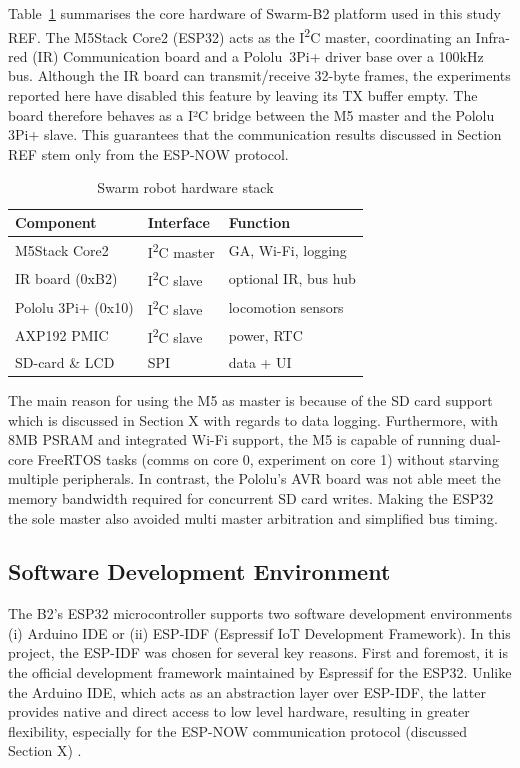 \documentclass[conference]{IEEEtran}
\begin{document}
Table~\ref{tab:B2-hardware} summarises the core hardware of Swarm-B2 platform used in this study REF. The M5Stack Core2 (ESP32) acts as the I\textsuperscript{2}C master, coordinating an Infra-red (IR) Communication board and a Pololu~3Pi+ driver base over a 100kHz bus. Although the IR board can transmit/receive 32-byte frames, the experiments reported here have disabled this feature by leaving its TX buffer empty. The board therefore behaves as a I²C bridge between the M5 master and the Pololu 3Pi+ slave. This guarantees that the communication results discussed in Section REF stem only from the ESP-NOW protocol.\\

\begin{table}[h]
  \centering
  \caption{Swarm robot hardware stack}
  \label{tab:B2-hardware}
  \begin{tabular}{lll}
    \toprule
    Component & Interface & Function \\
    \midrule
    M5Stack Core2 & I\textsuperscript{2}C master & GA, Wi-Fi, logging \\
    IR board (0xB2) & I\textsuperscript{2}C slave & optional IR, bus hub \\
    Pololu 3Pi+ (0x10) & I\textsuperscript{2}C slave & locomotion sensors \\
    AXP192 PMIC & I\textsuperscript{2}C slave & power, RTC \\
    SD-card \& LCD & SPI & data + UI \\
    \bottomrule
  \end{tabular}
\end{table}

The main reason for using the M5 as master is because of the SD card support which is discussed in Section X with regards to data logging. Furthermore, with 8MB PSRAM and integrated Wi-Fi support, the M5 is capable of running dual-core FreeRTOS tasks (comms on core 0, experiment on core 1) without starving multiple peripherals. In contrast, the Pololu's AVR board was not able meet the memory bandwidth required for concurrent SD card writes. Making the ESP32 the sole master also avoided multi master arbitration and simplified bus timing. 

\subsection{Software Development Environment}
The B2's ESP32 microcontroller supports two software development environments (i) Arduino IDE or (ii) ESP-IDF (Espressif IoT Development Framework). In this project, the ESP-IDF was chosen for several key reasons. First and foremost, it is the official development framework maintained by Espressif for the ESP32. Unlike the Arduino IDE, which acts as an abstraction layer over ESP-IDF, the latter provides native and direct access to low level hardware, resulting in greater flexibility, especially for the ESP-NOW communication protocol (discussed Section X) \cite{esp-boards_esp-idf_nodate}.\\
\end{document}
